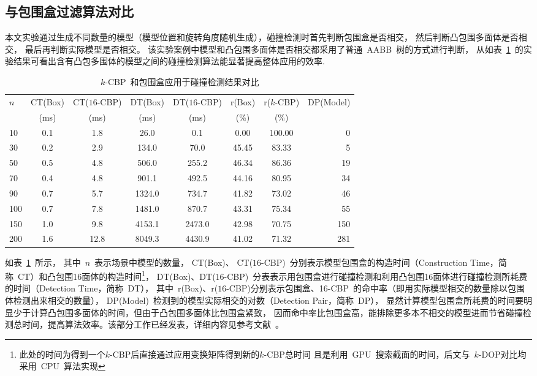 \subsection{与包围盒过滤算法对比}
\label{subsec:exper:box:kcbp}

本文实验通过生成不同数量的模型（模型位置和旋转角度随机生成），碰撞检测时首先判断包围盒是否相交， 然后判断凸包围多面体是否相交， 最后再判断实际模型是否相交。
该实验案例中模型和凸包围多面体是否相交都采用了普通~AABB~树的方式进行判断，
从如表~\ref{tab:exp:box:kcbp:collsiondetection}~的实验结果可看出含有凸包多围体的模型之间的碰撞检测算法能显著提高整体应用的效率. 

\begin{table}[H]
\caption{$k$-CBP~和包围盒应用于碰撞检测结果对比}
\label{tab:exp:box:kcbp:collsiondetection}
\centering
\begin{tabular}{lccccccr}
 \toprule[1.5pt]
 \multirow{2}{*}{$n$} & CT(Box) & CT($16$-CBP) & DT(Box) & DT($16$-CBP) & r(Box) & r($k$-CBP) & \multirow{2}{*}{DP(Model)} \\
                      & (ms)    & (ms)          & (ms)  & (ms)          & (\%)      & (\%)  &   \\
  \midrule[1.0pt]
   10 & 0.1 & 1.8 &    26.0  & 0.1    & 0.00  & 100.00 & 0\\
   30 & 0.2 & 2.9 &   134.0  & 70.0   & 45.45 & 83.33 & 5\\
   50 & 0.5 & 4.8 &   506.0  & 255.2  & 46.34 & 86.36 & 19 \\
   70 & 0.4 & 4.8 &   901.1  & 492.5  & 44.16 & 80.95 & 34 \\
   90 & 0.7 & 5.7 &  1324.0  & 734.7  & 41.82 & 73.02 & 46 \\
  100 & 0.7 & 7.8 &  1481.0  & 870.7  & 43.31 & 75.34 & 55 \\
  150 & 1.0 & 9.8 &  4153.1  & 2473.0 & 42.98 & 70.75 & 150 \\
  200 & 1.6 & 12.8 & 8049.3  & 4430.9 & 41.02 & 71.32 & 281 \\
  \bottomrule[1.5pt]
 \end{tabular}
\end{table}

如表~\ref{tab:exp:box:kcbp:collsiondetection}~所示，
其中~$n$~表示场景中模型的数量， CT(Box)、 CT($16$-CBP)~分别表示模型包围盒的构造时间（Construction Time，简称~CT）和凸包围16面体的构造时间\footnote{此处的时间为得到一个$k$-CBP后直接通过应用变换矩阵得到新的$k$-CBP总时间
且是利用~GPU~搜索截面的时间，后文与~$k$-DOP对比均采用~CPU~算法实现}， DT(Box)、DT($16$-CBP)~分表表示用包围盒进行碰撞检测和利用凸包围16面体进行碰撞检测所耗费的时间（Detection Time，简称~DT），
其中~r(Box)、r($16$-CBP)分别表示包围盒、16-CBP~的命中率（即用实际模型相交的数量除以包围体检测出来相交的数量）， DP(Model)~检测到的模型实际相交的对数（Detection Pair，简称~DP），
显然计算模型包围盒所耗费的时间要明显少于计算凸包围多面体的时间，但由于凸包围多面体比包围盒紧致，
因而命中率比包围盒高，能排除更多本不相交的模型进而节省碰撞检测总时间，提高算法效率。该部分工作已经发表，详细内容见参考文献~。

